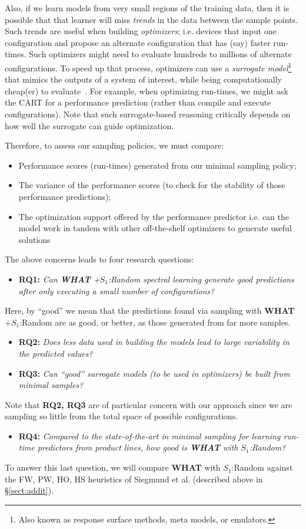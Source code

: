 \documentclass{sig-alternative}
\newcommand{\bi}{\begin{itemize}}%
\newcommand{\ei}{\end{itemize}}
\newcommand{\tion}[1]{\S\ref{sect:#1}}
\newcommand{\what}{{\bf WHAT }}
\begin{document}
Also, if we learn models from very small regions of the training data,
then it is  possible that that learner will miss {\em trends} in the data
between the sample points. Such trends are useful when building {\em optimizers};
i.e. devices that input one configuration and propose an alternate
configuration that has (say) faster run-times. Such optimizers might
need to evaluate hundreds to millions of alternate configurations. 
To speed up that process, optimizers can use a {\em surrogate model}\footnote{Also known as response surface methods, meta models, or emulators.}
that  mimics the outputs of a system of interest, while being computationally cheap(er) to evaluate~\cite{loshchilov13}. For example, when optimizing
run-times, we might ask the CART  for a performance
prediction (rather than compile and execute
configurations).  Note that such surrogate-based
reasoning critically depends on how well the surrogate can guide optimization.


Therefore, to assess our sampling policies, we must compare:
\bi
\item Performance scores (run-times) generated from our minimal sampling policy;
\item The variance of the performance scores (to check for the stability
of those performance predictions);
\item The optimization support offered by the performance predictor i.e. can the model work in tandem with other off-the-shelf optimizers to generate useful solutions
\ei
The above concerns leads to four research questions:
\bi
\item {\bf RQ1:} {\em Can  \what  +$S_1$:Random spectral learning generate good predictions after only
executing a small number of configurations?}
\ei
Here, by ``good'' we mean that the predictions found via sampling with \what+$S_1$:Random are as good, or better,
as those generated from far more samples.
\bi
\item {\bf RQ2:} {\em
Does less data used in building the models lead to large variability in the predicted values?}
\item {\bf RQ3:} {\em
Can ``good'' surrogate models (to be used in optimizers)
be built from minimal samples?}
\ei
Note that {\bf RQ2, RQ3} are of particular concern with our approach
since we are sampling so little from the total space of possible
configurations.
\bi
\item {\bf RQ4:} {\em Compared to the state-of-the-art in minimal sampling for
learning run-time predictors from product lines, how good is \what with $S_1$:Random?}
\ei
To answer this last question, we will compare \what with $S_1$:Random
          against the FW, PW, HO, HS heuristics of Siegmund et al. (described above in \tion{addit}).
 
\end{document}
